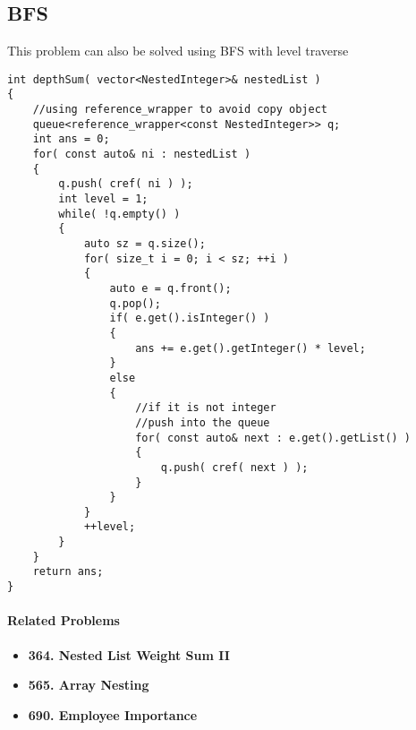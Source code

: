 \subsection{BFS}
This problem can also be solved using BFS with level traverse

\begin{lstlisting}[style=customc, caption={BFS}]
int depthSum( vector<NestedInteger>& nestedList )
{
    //using reference_wrapper to avoid copy object
    queue<reference_wrapper<const NestedInteger>> q;
    int ans = 0;
    for( const auto& ni : nestedList )
    {
        q.push( cref( ni ) );
        int level = 1;
        while( !q.empty() )
        {
            auto sz = q.size();
            for( size_t i = 0; i < sz; ++i )
            {
                auto e = q.front();
                q.pop();
                if( e.get().isInteger() )
                {
                    ans += e.get().getInteger() * level;
                }
                else
                {
                    //if it is not integer
                    //push into the queue
                    for( const auto& next : e.get().getList() )
                    {
                        q.push( cref( next ) );
                    }
                }
            }
            ++level;
        }
    }
    return ans;
}
\end{lstlisting}

\paragraph{Related Problems}
\begin{itemize}
\item \textbf{364. Nested List Weight Sum II}
\item \textbf{565. Array Nesting}
\item \textbf{690. Employee Importance}
\end{itemize}